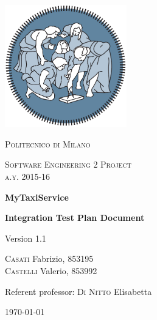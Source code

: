 \begin{titlepage}
	\centering
	\includegraphics[width=150pt]{title/polimi_logo}\par\vspace{1cm}
	{\scshape\LARGE
		Politecnico di Milano\par}
	\vspace{1cm}
	{\scshape\Large
		Software Engineering 2 Project\\
		a.y. 2015-16\par}
	\vspace{1.5cm}
	{\huge\bfseries
		MyTaxiService\\\par}
	{\Large\bfseries
		Integration Test Plan Document\par}
	Version 1.1\par
	\vspace{2cm}
	{\Large
		{\scshape Casati} Fabrizio, 853195\\
		{\scshape Castelli} Valerio, 853992\par}
	\vfill
	Referent professor: {\scshape Di Nitto} Elisabetta\par
	\vfill
	{\large\today\par}
\end{titlepage}
